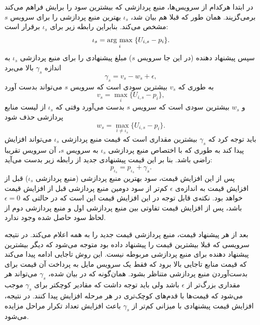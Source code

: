       در ابتدا هرکدام از سرویس‌ها، منبع پردازشی که بیشترین سود را برایش فراهم می‌کند برمی‌گزیند.
      همان طور که قبلا هم بیان شد، $\iota_s$ بهترین منبع پردازشی را برای سرویس $s$ مشخص می‌کند.
      بنابراین رابطه زیر برای $\iota_s$ برقرار است:
      \begin{equation}\label{eqn:argmax_benefit}
        \iota_s = \underset{i}{\operatorname{arg}\,\operatorname{max}}\;\{U_{i,s} - p_i\}.
      \end{equation}
      سپس پیشنهاد دهنده (در این جا سرویس $s$) مبلغ پیشنهادی را برای منبع پردازشی $\iota_s$ به اندازه $\gamma_s$ بالا می‌برد
      \begin{equation}\label{eqn:bid_increase_1}
        \gamma_s = v_s - w_s + \epsilon,
      \end{equation}
      به طوری که $v_s$ بیشترین سودی است که سرویس $s$ می‌تواند بدست آورد
      \begin{equation}\label{eqn:bid_increase_2}
        v_s = \max_i\{U_{i,s} - p_i\},
      \end{equation}
      و $w_s$ بیشترین سودی است که سرویس $s$ بدست می‌آورد وقتی که $\iota_s$ از لیست منابع پردازشی حذف شود
      \begin{equation}\label{eqn:bid_increase_3}
        w_s = \max_{i \ne \iota_s}\{U_{i,s} - p_i\}.
      \end{equation}
      باید توجه کرد که $\gamma_s$ بیشترین مقداری است که قیمت منبع پردازشی $\iota_s$ می‌تواند افزایش پیدا کند به طوری که با اختصاص منبع پردازشی $\iota_s$ به سرویس $s$، آن سرویس تقریبا راضی باشد.
      بنا بر این قیمت پیشنهادی جدید از رابطه زیر بدست می‌آید:
      \begin{equation}\label{eqn:bid_increase_4}
        p_{\iota_s} = p_{\iota_s} + \gamma_s.
      \end{equation}
      پس از این افزایش قیمت، سود بهترین منبع پردازشی (منبع پردازشی $\iota_s$) قبل از افزایش قیمت به اندازه‌ی $\epsilon$ کم‌تر از سود دومین منبع پردازشی قبل از افزایش قیمت خواهد بود.
      نکته‌ی قابل توجه در این افزایش قیمت این است که در حالتی که $\epsilon = 0$ باشد، پس از افزایش قیمت تفاوتی بین منبع پردازشی اول و منبع پردازشی دوم از لحاظ سود حاصل شده وجود ندارد.

      بعد از هر پیشنهاد قیمت، منبع پردازشی قیمت جدید را به همه اعلام می‌کند.
      در نتیجه سرویسی که قبلا بیشترین قیمت را پیشنهاد داده بود متوجه می‌شود که دیگر بیشترین پیشنهاد دهنده برای منبع پردازشی مربوطه نیست.
      این روش تاجایی ادامه پیدا می‌کند که قیمت منابع تاجایی بالا برود که فقط یک سرویس مایل به پرداخت آن قیمت برای بدست‌آوردن منبع پردازشی متناظر بشود.
      همان‌گونه که در \cite{auction_algorithms_bertsekas} بیان شده، $\gamma_s$ می‌تواند هر مقداری بزرگ‌تر از $\epsilon$ باشد ولی باید توجه داشت که مقادیر کوچکتر برای $\gamma_s$ موجب می‌شود که قیمت‌ها با قدم‌های کوچک‌تری در هر مرحله افزایش پیدا کنند.
      در نتیجه، افزایش قیمت پیشنهادی با میزانی کم‌تر از $\gamma_s$ باعث افزایش تعداد تکرار مراحل مزایده می‌شود.


